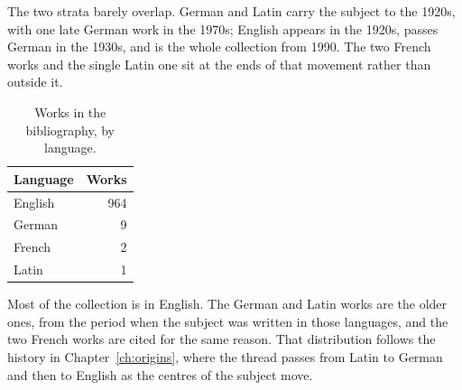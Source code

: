 
The two strata barely overlap. German and Latin carry the subject to the 1920s, with %
one late German work in the 1970s; English appears in the 1920s, passes German in %
the 1930s, and is the whole collection from 1990. The two French works and the single Latin one sit %
at the ends of that movement rather than outside it. %

\begin{table}[htbp]
  \centering
  \caption{Works in the bibliography, by language.}
  \label{tab:atlas:language}
  \begin{tabular}{lr}
    \toprule
    Language & Works \\ %
    \midrule
    English & 964 \\ %
    German  & 9   \\ %
    French  & 2   \\ %
    Latin   & 1   \\ %
    \bottomrule
  \end{tabular}
\end{table}

Most of the collection is in English. %
The German and Latin works are the older ones, from the period when the subject %
was written in those languages, and the two French works are cited for the same %
reason. %
That distribution follows the history in Chapter~\ref{ch:origins}, where the %
thread passes from Latin to German and then to English as the centres of the %
subject move. %

